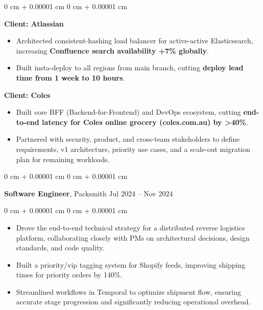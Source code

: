 \documentclass[10pt, letterpaper]{article}
\newenvironment{highlights}{
    \begin{itemize}[
        topsep=0.10 cm,
        parsep=0.10 cm,
        partopsep=0pt,
        itemsep=0pt,
        leftmargin=0 cm + 10pt
    ]
}{
    \end{itemize}
} %
\newenvironment{onecolentry}{
    \begin{adjustwidth}{
        0 cm + 0.00001 cm
    }{
        0 cm + 0.00001 cm
    }
}{
    \end{adjustwidth}
} %
\newenvironment{twocolentry}[2][]{
    \onecolentry
    \def\secondColumn{#2}
    \setcolumnwidth{\fill, 4.5 cm}
    \begin{paracol}{2}
}{
    \switchcolumn \raggedleft \secondColumn
    \end{paracol}
    \endonecolentry
} %
\begin{document}
\begin{onecolentry}
            \vspace{0.10 cm}
            \textbf{Client: Atlassian}
            \begin{highlights}
                \item Architected consistent-hashing load balancer for active-active Elasticsearch, increasing \textbf{Confluence search availability +7\% globally}.
                \item Built insta-deploy to all regions from main branch, cutting \textbf{deploy lead time from 1 week to 10 hours}.
            \end{highlights}
            
            \vspace{0.10 cm}
            \textbf{Client: Coles}
            \begin{highlights}
                \item Built core BFF (Backend-for-Frontend) and DevOps ecosystem, cutting \textbf{end-to-end latency for Coles online grocery (coles.com.au) by >40\%}.
                \item Partnered with security, product, and cross-team stakeholders to define requirements, v1 architecture, priority use cases, and a scale-out migration plan for remaining workloads.
            \end{highlights}
        \end{onecolentry}

        \vspace{0.15 cm}
        \begin{twocolentry}{
            Jul 2024 – Nov 2024
        }
            \textbf{Software Engineer}, Packsmith\end{twocolentry}

        \vspace{0.10 cm}
        \begin{onecolentry}
            \begin{highlights}
                \item Drove the end-to-end technical strategy for a distributed reverse logistics platform, collaborating closely with PMs on architectural decisions, design standards, and code quality.
                \item Built a priority/vip tagging system for Shopify feeds, improving shipping times for priority orders by 140\%.
                \item Streamlined workflows in Temporal to optimize shipment flow, ensuring accurate stage progression and significantly reducing operational overhead.
            \end{highlights}
        \end{onecolentry}
        
\end{document}
